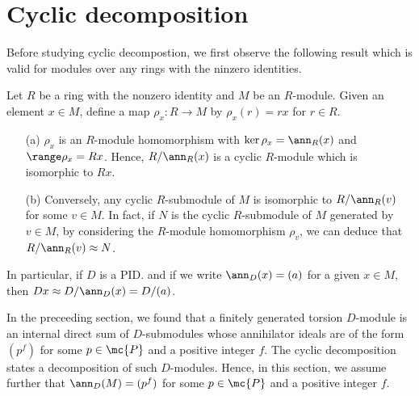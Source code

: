 \section{Cyclic decomposition}\label{Cyclic decomposition}

Before studying cyclic decompostion, we first observe the following result which is valid for modules over any rings with the ninzero identities.
\begin{obs}\label{cyclic submodules are isomorphic to the quotients of the ring by an ideal}
    Let $R$ be a ring with the nonzero identity and $M$ be an $R$-module.
    Given an element $x\in M$, define a map $\rho_x: R\rightarrow M$ by $\rho_x(r)=rx$ for $r\in R$.
    \begin{enumerate}
        \item[(a)]
        {
            $\rho_x$ is an $R$-module homomorphism with $\ker\rho_x=\ann_R(x)$ and $\range\rho_x=Rx$.
            Hence, $R/\ann_R(x)$ is a cyclic $R$-module which is isomorphic to $Rx$.
        }
        \item[(b)]
        {
            Conversely, any cyclic $R$-submodule of $M$ is isomorphic to $R/\ann_R(v)$ for some $v\in M$.
            In fact, if $N$ is the cyclic $R$-submodule of $M$ generated by $v\in M$, by considering the $R$-module homomorphism $\rho_v$, we can deduce that $R/\ann_R(v)\approx N$.
        }
    \end{enumerate}
    In particular, if $D$ is a PID. and if we write $\ann_D(x)=(a)$ for a given $x\in M$, then $Dx\approx D/\ann_D(x)=D/(a)$.
\end{obs}

In the preceeding section, we found that a finitely generated torsion $D$-module is an internal direct sum of $D$-submodules whose annihilator ideals are of the form $(p^f)$ for some $p\in\mc{P}$ and a positive integer $f$.
The cyclic decomposition states a decomposition of such $D$-modules.
Hence, in this section, we assume further that $\ann_D(M)=(p^f)$ for some $p\in\mc{P}$ and a positive integer $f$.

